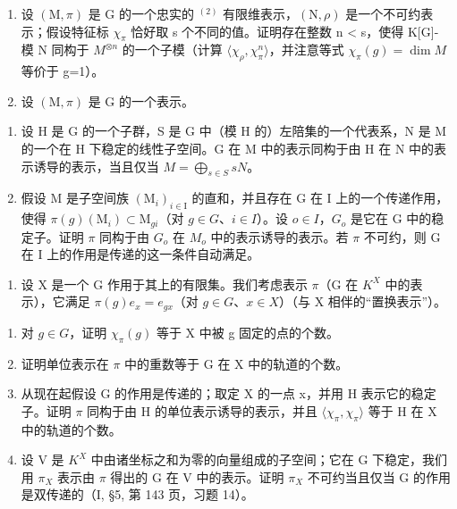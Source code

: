 \begin{enumerate}
\def\labelenumi{\arabic{enumi})}
\setcounter{enumi}{3}
\item
  设 \((\mathrm{M},\pi)\) 是 G 的一个忠实的 \(^{(2)}\) 有限维表示，\((\mathrm{N},\rho)\) 是一个不可约表示；假设特征标 \(\chi_{\pi}\) 恰好取 s 个不同的值。证明存在整数 n \textless{} s，使得 K{[}G{]}-模 N 同构于 \(M^{\otimes n}\) 的一个子模（计算 \(\langle\chi_{\rho},\chi_{\pi}^{n}\rangle\)，并注意等式 \(\chi_{\pi}(g)=\dim M\) 等价于 g=1）。
\item
  设 \((\mathrm{M},\pi)\) 是 G 的一个表示。
\end{enumerate}

\begin{enumerate}
\def\labelenumi{\alph{enumi})}
\item
  设 H 是 G 的一个子群，S 是 G 中（模 H 的）左陪集的一个代表系，N 是 M 的一个在 H 下稳定的线性子空间。G 在 M 中的表示同构于由 H 在 N 中的表示诱导的表示，当且仅当 \(M = \bigoplus_{s \in S} sN\)。
\item
  假设 M 是子空间族 \((\mathrm{M}_{i})_{i\in\mathrm{I}}\) 的直和，并且存在 G 在 I 上的一个传递作用，使得 \(\pi(g)(\mathrm{M}_{i})\subset\mathrm{M}_{gi}\)（对 \(g\in G\)、\(i\in I\)）。设 \(o\in I\)，\(G_{o}\) 是它在 G 中的稳定子。证明 \(\pi\) 同构于由 \(G_{o}\) 在 \(M_{o}\) 中的表示诱导的表示。若 \(\pi\) 不可约，则 G 在 I 上的作用是传递的这一条件自动满足。
\end{enumerate}

\begin{enumerate}
\def\labelenumi{\arabic{enumi})}
\setcounter{enumi}{5}
\tightlist
\item
  设 X 是一个 G 作用于其上的有限集。我们考虑表示 \(\pi\)（G 在 \(K^{X}\) 中的表示），它满足 \(\pi(g)e_{x}=e_{gx}\)（对 \(g\in G\)、\(x\in X\)）（与 X 相伴的“置换表示”）。
\end{enumerate}

\begin{enumerate}
\def\labelenumi{\alph{enumi})}
\item
  对 \(g \in G\)，证明 \(\chi_{\pi}(g)\) 等于 X 中被 g 固定的点的个数。
\item
  证明单位表示在 \(\pi\) 中的重数等于 G 在 X 中的轨道的个数。
\item
  从现在起假设 G 的作用是传递的；取定 X 的一点 x，并用 H 表示它的稳定子。证明 \(\pi\) 同构于由 H 的单位表示诱导的表示，并且 \(\langle\chi_{\pi},\chi_{\pi}\rangle\) 等于 H 在 X 中的轨道的个数。
\item
  设 V 是 \(K^{X}\) 中由诸坐标之和为零的向量组成的子空间；它在 G 下稳定，我们用 \(\pi_{X}\) 表示由 \(\pi\) 得出的 G 在 V 中的表示。证明 \(\pi_{X}\) 不可约当且仅当 G 的作用是双传递的（I, §5, 第 143 页，习题 14）。
\end{enumerate}

